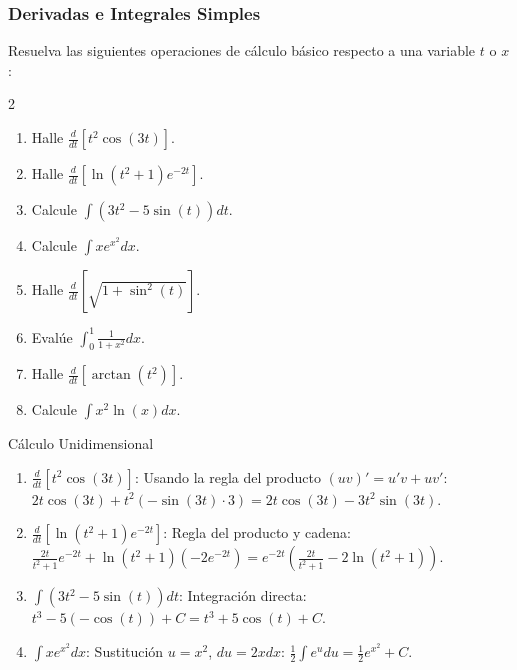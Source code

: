 \subsubsection{Derivadas e Integrales Simples}
Resuelva las siguientes operaciones de cálculo básico respecto a una variable $t$ o $x$:

\begin{multicols}{2}
\begin{enumerate}
    \item Halle $\frac{d}{dt} [t^2 \cos(3t)]$.
    \item Halle $\frac{d}{dt} [ \ln(t^2 + 1) e^{-2t} ]$.
    \item Calcule $\int (3t^2 - 5\sin(t)) dt$.
    \item Calcule $\int x e^{x^2} dx$.
    \item Halle $\frac{d}{dt} [ \sqrt{1 + \sin^2(t)} ]$.
    \item Evalúe $\int_0^1 \frac{1}{1+x^2} dx$.
    \item Halle $\frac{d}{dt} [ \arctan(t^2) ]$.
    \item Calcule $\int x^2 \ln(x) dx$.
\end{enumerate}
\end{multicols}
\begin{solucion}{Cálculo Unidimensional}
\begin{enumerate}
    \item $\frac{d}{dt} [t^2 \cos(3t)]$: Usando la regla del producto $(uv)' = u'v + uv'$:
    $2t \cos(3t) + t^2 (-\sin(3t) \cdot 3) = 2t\cos(3t) - 3t^2\sin(3t)$.
    
    \item $\frac{d}{dt} [ \ln(t^2 + 1) e^{-2t} ]$: Regla del producto y cadena:
    $\frac{2t}{t^2+1} e^{-2t} + \ln(t^2+1) (-2e^{-2t}) = e^{-2t} \left( \frac{2t}{t^2+1} - 2\ln(t^2+1) \right)$.
    
    \item $\int (3t^2 - 5\sin(t)) dt$: Integración directa:
    $t^3 - 5(-\cos(t)) + C = t^3 + 5\cos(t) + C$.
    
    \item $\int x e^{x^2} dx$: Sustitución $u = x^2$, $du = 2x dx$:
    $\frac{1}{2} \int e^u du = \frac{1}{2} e^{x^2} + C$.
\end{enumerate}
\end{solucion}
